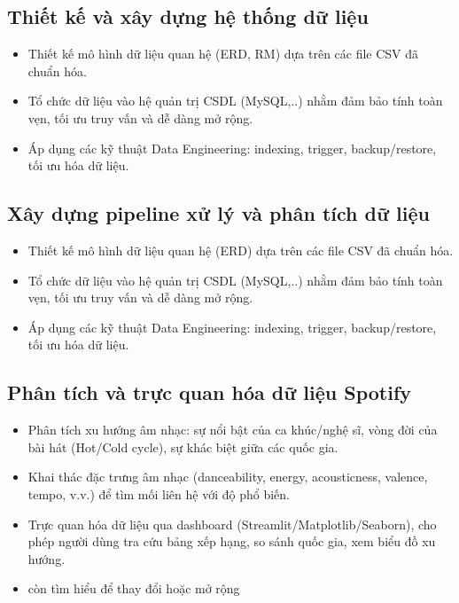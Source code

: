 \documentclass{../hcmut-report}
\begin{document}
\subsection{Thiết kế và xây dựng hệ thống dữ liệu}
\begin{itemize}
    \item Thiết kế mô hình dữ liệu quan hệ (ERD, RM) dựa trên các file CSV đã chuẩn hóa.
    \item Tổ chức dữ liệu vào hệ quản trị CSDL (MySQL,..) nhằm đảm bảo tính toàn vẹn, tối ưu truy vấn và dễ dàng mở rộng.
    \item Áp dụng các kỹ thuật Data Engineering: indexing, trigger, backup/restore, tối ưu hóa dữ liệu.
\end{itemize}

\subsection{Xây dựng pipeline xử lý và phân tích dữ liệu}
\begin{itemize}
    \item Thiết kế mô hình dữ liệu quan hệ (ERD) dựa trên các file CSV đã chuẩn hóa.
    \item Tổ chức dữ liệu vào hệ quản trị CSDL (MySQL,..) nhằm đảm bảo tính toàn vẹn, tối ưu truy vấn và dễ dàng mở rộng.
    \item Áp dụng các kỹ thuật Data Engineering: indexing, trigger, backup/restore, tối ưu hóa dữ liệu.
\end{itemize}


\subsection{Phân tích và trực quan hóa dữ liệu Spotify}
\begin{itemize}
    \item Phân tích xu hướng âm nhạc: sự nổi bật của ca khúc/nghệ sĩ, vòng đời của bài hát (Hot/Cold cycle), sự khác biệt giữa các quốc gia.
    \item Khai thác đặc trưng âm nhạc (danceability, energy, acousticness, valence, tempo, v.v.) để tìm mối liên hệ với độ phổ biến.
    \item Trực quan hóa dữ liệu qua dashboard (Streamlit/Matplotlib/Seaborn), cho phép người dùng tra cứu bảng xếp hạng, so sánh quốc gia, xem biểu đồ xu hướng.
    \item còn tìm hiểu để thay đổi hoặc mở rộng
\end{itemize}
\end{document}
